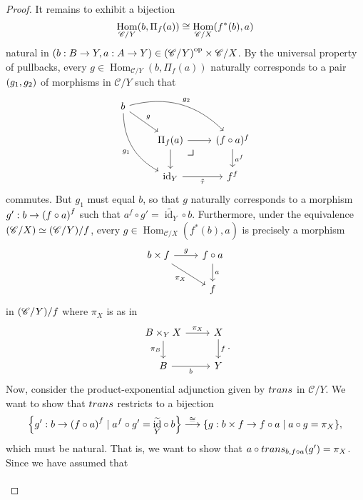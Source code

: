 \documentclass[10pt,letterpaper,cm]{nupset}
\theoremstyle{definition}
\theoremstyle{theorem}
\theoremstyle{remark}
\newcommand{\0}{\mathbf{0}}
\newcommand{\1}{\mathbf{1}}
\newcommand{\2}{\mathbf{2}}
\DeclareMathOperator{\op}{op}
\renewcommand{\c}{\mathscr{C}}
\DeclareMathOperator{\Hom}{Hom}
\DeclareMathOperator{\idd}{id}
\DeclareMathOperator{\trans}{\mathnormal{trans}}
\begin{document}
\begin{proof}
\smallskip
It remains to exhibit a bijection $$\Hom_{\c/Y}\mleft(b, \Pi_f(a)\mright) \cong \Hom_{\c/X}\mleft(f^{\ast}(b), a\mright)$$ natural in  $\mleft(b: B \to Y, a:A \to Y\mright) \in \mleft(\c/Y\mright)^{\op} \times \c/X$. By the universal property of pullbacks, every $g\in \Hom_{\c/Y}(b, \Pi_f(a))$ naturally corresponds  to a pair $\mleft(g_1, g_2\mright)$ of morphisms in $\c/Y$ such that
\[
\begin{tikzcd}
b \arrow[rd, "g"] \arrow[rdd, "g_1"', bend right] \arrow[rrd, "g_2", bend left] &                                         &                               \\
                                                                           & \Pi_f(a) \arrow[d] \arrow[r]  
\arrow[dr, phantom, "\scalebox{1.5}{\color{black}$\lrcorner$}" , very near start, color=black]
          & (f\circ a)^f \arrow[d, "a^f"] \\
                                                                           & \idd_Y \arrow[r, "\tilde{\tau}"'] & f^f                          
\end{tikzcd}
\]
commutes. But $g_1$ must equal $b$, so that $g$ naturally corresponds to a morphism $g' : b \to \mleft(f\circ a\mright)^f$ such that $a^f \circ g' = \widetilde{\idd_Y} \circ b$.
Furthermore, under the equivalence $\mleft(\c/X\mright) \simeq \mleft(\c/Y\mright)/f$, every $g \in \Hom_{\c/X}(f^{\ast}(b), a)$ is precisely a morphism
\[
\begin{tikzcd}
b\times f \arrow[r, "g"] \arrow[rd, "\pi_X"'] & f\circ a \arrow[d, "a"] \\
                                              & f                      
\end{tikzcd}
\]
in $\mleft(\c/Y\mright)/f$ where $\pi_X$ is as in
\[
\begin{tikzcd}
B\times_Y X \arrow[d, "\pi_B"'] \arrow[r, "\pi_X"] & X\arrow[d, "f"] \\
B \arrow[r, "b"']                         & Y               
\end{tikzcd}
.\]  Now, consider the product-exponential adjunction given by $\trans$ in $\c/Y$. We want to show that $\trans$ restricts to a bijection $$\mleft\{g' : b \to \mleft(f\circ a\mright)^f \mid a^f \circ g' = \widetilde{\idd_Y} \circ b\mright\} \overset{\cong}{\longrightarrow} \mleft\{g : b \times f \to f \circ a \mid a \circ g = \pi_X\mright\},$$ which must be natural. That is, we want to show that $a \circ \trans_{b, f\circ a}(g') = \pi_X$. Since we have assumed that 
\[
\begin{tikzcd}

\end{tikzcd}\]
\end{proof}
\end{document}
